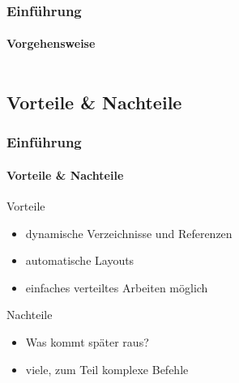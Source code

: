 
\begin{frame}
\frametitle{Einf\"uhrung}
\framesubtitle{Vorgehensweise}
\begin{columns}[onlytextwidth]
\begin{column}{0.40\textwidth}
\end{column}
\begin{column}{0.25\textwidth}
\end{column}
\begin{column}{0.25\textwidth}
\end{column}
\end{columns}
\end{frame}



\subsection{Vorteile \& Nachteile}
\begin{frame}
\frametitle{Einf\"uhrung}
\framesubtitle{Vorteile \& Nachteile}
Vorteile
\begin{itemize}
\item  dynamische Verzeichnisse und Referenzen
\item  automatische Layouts
\item  einfaches verteiltes Arbeiten möglich
\end{itemize}
Nachteile
\begin{itemize}
\item  Was kommt später raus?
\item  viele, zum Teil komplexe Befehle
\end{itemize}
\end{frame}


